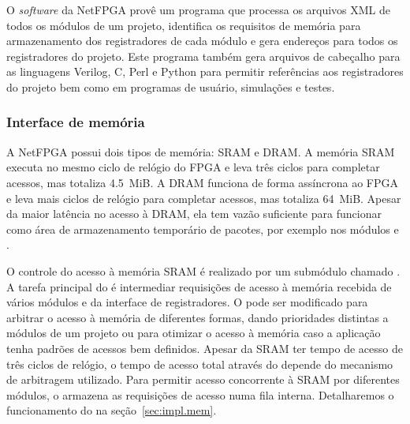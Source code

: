 \newpage{}

O \emph{software} da NetFPGA provê um programa que processa os
arquivos XML de todos os módulos de um projeto, identifica os
requisitos de memória para armazenamento dos registradores de cada
módulo e gera endereços para todos os registradores do projeto.
Este programa também gera arquivos de cabeçalho para as linguagens
Verilog, C, Perl e Python para permitir referências aos
registradores do projeto bem como em programas de usuário,
simulações e testes.

\subsubsection{Interface de memória}

A NetFPGA possui dois tipos de memória: SRAM e DRAM.  A memória SRAM
executa no mesmo ciclo de relógio do FPGA e leva três ciclos para
completar acessos, mas totaliza 4.5~MiB.  A DRAM funciona de forma
assíncrona ao FPGA e leva mais ciclos de relógio para completar
acessos, mas totaliza 64~MiB.  Apesar da maior latência no acesso à
DRAM, ela tem vazão suficiente para funcionar como área de
armazenamento temporário de pacotes, por exemplo nos módulos
 e .

O controle do acesso à memória SRAM é realizado por um submódulo
chamado .  A tarefa principal do
 é intermediar requisições de acesso à memória
recebida de vários módulos e da interface de registradores.  O
 pode ser modificado para arbitrar o acesso à
memória de diferentes formas, dando prioridades distintas a módulos
de um projeto ou para otimizar o acesso à memória caso a aplicação
tenha padrões de acessos bem definidos.  Apesar da SRAM ter tempo de
acesso de três ciclos de relógio, o tempo de acesso total através do
 depende do mecanismo de arbitragem utilizado.
Para permitir acesso concorrente à SRAM por diferentes módulos, o
 armazena as requisições de acesso numa fila
interna.  Detalharemos o funcionamento do  na
seção~\ref{sec:impl.mem}.

